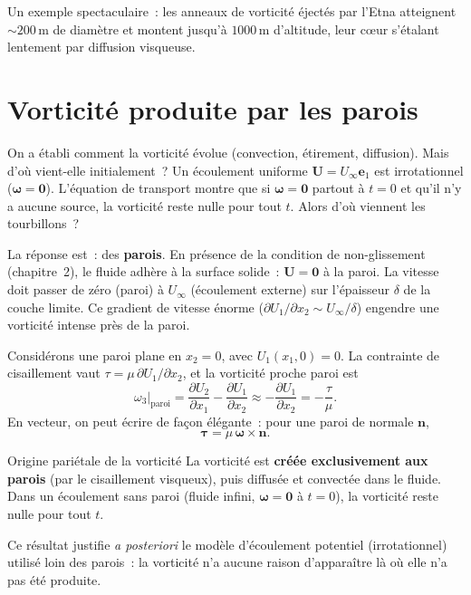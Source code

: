 \documentclass[11pt,a4paper]{report}
\newcommand{\pd}[2]{\dfrac{\partial #1}{\partial #2}}
\begin{document}
\medskip
Un exemple spectaculaire~: les anneaux de vorticit\'e \'eject\'es par l'Etna atteignent
${\sim}200\,\mathrm{m}$ de diam\`etre et montent jusqu'\`a $1000\,\mathrm{m}$ d'altitude,
leur c\oe ur s'\'etalant lentement par diffusion visqueuse.

\section{Vorticit\'e produite par les parois}

On a \'etabli comment la vorticit\'e \'evolue (convection, \'etirement, diffusion). Mais
d'o\`u vient-elle initialement~? Un \'ecoulement uniforme $\bm{U} = U_\infty\bm{e}_1$
est irrotationnel ($\boldsymbol{\omega} = \bm{0}$). L'\'equation de transport montre que
si $\boldsymbol{\omega} = \bm{0}$ partout \`a $t=0$ et qu'il n'y a aucune source, la
vorticit\'e reste nulle pour tout $t$. Alors d'o\`u viennent les tourbillons~?

La r\'eponse est~: des \textbf{parois}. En pr\'esence de la condition de non-glissement
(chapitre~2), le fluide adh\`ere \`a la surface solide~: $\bm{U} = \bm{0}$ \`a la paroi.
La vitesse doit passer de z\'ero (paroi) \`a $U_\infty$ (\'ecoulement externe) sur
l'\'epaisseur $\delta$ de la couche limite. Ce gradient de vitesse \'enorme
($\partial U_1/\partial x_2 \sim U_\infty/\delta$) engendre une vorticit\'e intense
pr\`es de la paroi.

Consid\'erons une paroi plane en $x_2 = 0$, avec $U_1(x_1,0) = 0$. La contrainte de
cisaillement vaut $\tau = \mu\,\partial U_1/\partial x_2$, et la vorticit\'e proche paroi est
\[
  \omega_3\big|_{\text{paroi}} = \pd{U_2}{x_1} - \pd{U_1}{x_2}
  \approx -\pd{U_1}{x_2} = -\frac{\tau}{\mu}.
\]
En vecteur, on peut \'ecrire de fa\c con \'el\'egante~: pour une paroi de normale
$\boldsymbol{n}$,
\[
  \boldsymbol{\tau} = \mu\,\boldsymbol{\omega} \times \boldsymbol{n}.
\]

\begin{importantbox}{Origine pari\'etale de la vorticit\'e}
La vorticit\'e est \textbf{cr\'e\'ee exclusivement aux parois} (par le cisaillement visqueux),
puis diffus\'ee et convect\'ee dans le fluide. Dans un \'ecoulement sans paroi (fluide infini,
$\boldsymbol{\omega}=\bm{0}$ \`a $t=0$), la vorticit\'e reste nulle pour tout $t$.

Ce r\'esultat justifie \emph{a posteriori} le mod\`ele d'\'ecoulement potentiel (irrotationnel)
utilis\'e loin des parois~: la vorticit\'e n'a aucune raison d'appara\^itre l\`a o\`u elle
n'a pas \'et\'e produite.
\end{importantbox}
\end{document}
